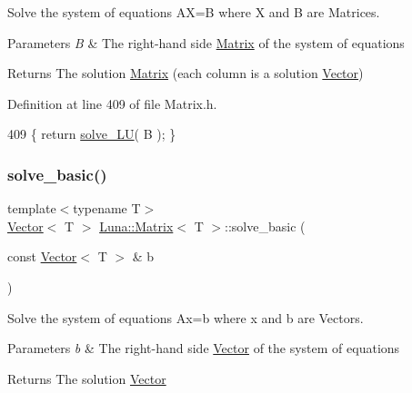 Solve the system of equations AX=B where X and B are Matrices. 


\begin{DoxyParams}{Parameters}
{\em B} & The right-\/hand side \hyperlink{classLuna_1_1Matrix}{Matrix} of the system of equations \\
\hline
\end{DoxyParams}
\begin{DoxyReturn}{Returns}
The solution \hyperlink{classLuna_1_1Matrix}{Matrix} (each column is a solution \hyperlink{classLuna_1_1Vector}{Vector}) 
\end{DoxyReturn}


Definition at line 409 of file Matrix.\+h.


\begin{DoxyCode}
409 \{ \textcolor{keywordflow}{return} \hyperlink{classLuna_1_1Matrix_a9e065767864b479a535c4eccce35147d}{solve\_LU}( B ); \}
\end{DoxyCode}
\mbox{\label{classLuna_1_1Matrix_ae4bc0746bf6780696ef7b40a56c7ce4a}} 
\subsubsection{\texorpdfstring{solve\+\_\+basic()}{solve\_basic()}\hspace{0.1cm}{\footnotesize\ttfamily [1/2]}}
{\footnotesize\ttfamily template$<$typename T$>$ \\
\hyperlink{classLuna_1_1Vector}{Vector}$<$ T $>$ \hyperlink{classLuna_1_1Matrix}{Luna\+::\+Matrix}$<$ T $>$\+::solve\+\_\+basic (\begin{DoxyParamCaption}\item[{const \hyperlink{classLuna_1_1Vector}{Vector}$<$ T $>$ \&}]{b }\end{DoxyParamCaption})\hspace{0.3cm}{\ttfamily [inline]}}



Solve the system of equations Ax=b where x and b are Vectors. 


\begin{DoxyParams}{Parameters}
{\em b} & The right-\/hand side \hyperlink{classLuna_1_1Vector}{Vector} of the system of equations \\
\hline
\end{DoxyParams}
\begin{DoxyReturn}{Returns}
The solution \hyperlink{classLuna_1_1Vector}{Vector} 
\end{DoxyReturn}



